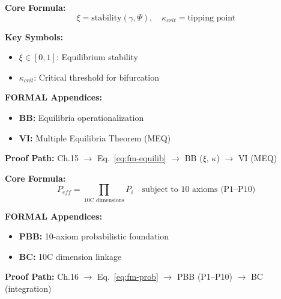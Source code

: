 \begin{tcolorbox}[colback=green!3!white, colframe=green!60!black,
    title=\textbf{Chapter 15: WEC Synthesis (Equilibria)}]

\textbf{Core Formula:}
\begin{equation}
\xi = \text{stability}(\gamma, \Psi), \quad \kappa_{crit} = \text{tipping point}
\label{eq:fm-equilib}
\end{equation}

\textbf{Key Symbols:}
\begin{itemize}[nosep]
    \item $\xi \in [0,1]$: Equilibrium stability
    \item $\kappa_{crit}$: Critical threshold for bifurcation
\end{itemize}

\textbf{FORMAL Appendices:}
\begin{itemize}[nosep]
    \item \textbf{BB:} Equilibria operationalization
    \item \textbf{VI:} Multiple Equilibria Theorem (MEQ)
\end{itemize}

\textbf{Proof Path:} Ch.15 $\rightarrow$ Eq.~\ref{eq:fm-equilib} $\rightarrow$ BB ($\xi$, $\kappa$) $\rightarrow$ VI (MEQ)

\end{tcolorbox}

\begin{tcolorbox}[colback=green!3!white, colframe=green!60!black,
    title=\textbf{Chapter 16: Probability of Behavior Change}]

\textbf{Core Formula:}
\begin{equation}
P_{eff} = \prod_{\text{10C dimensions}} P_i \quad \text{subject to 10 axioms (P1--P10)}
\label{eq:fm-prob}
\end{equation}

\textbf{FORMAL Appendices:}
\begin{itemize}[nosep]
    \item \textbf{PBB:} 10-axiom probabilistic foundation
    \item \textbf{BC:} 10C dimension linkage
\end{itemize}

\textbf{Proof Path:} Ch.16 $\rightarrow$ Eq.~\ref{eq:fm-prob} $\rightarrow$ PBB (P1--P10) $\rightarrow$ BC (integration)

\end{tcolorbox}


